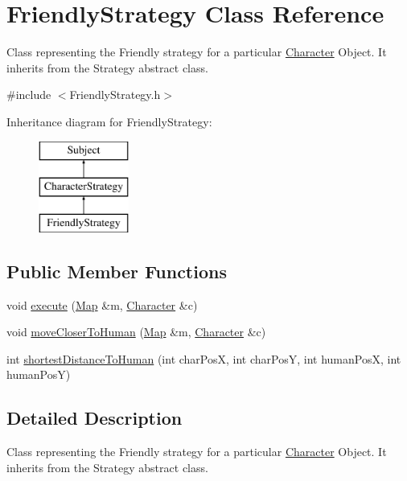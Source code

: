 \hypertarget{class_friendly_strategy}{}\section{Friendly\+Strategy Class Reference}
\label{class_friendly_strategy}


Class representing the Friendly strategy for a particular \hyperlink{class_character}{Character} Object. It inherits from the Strategy abstract class.  




{\ttfamily \#include $<$Friendly\+Strategy.\+h$>$}

Inheritance diagram for Friendly\+Strategy\+:\begin{figure}[H]
\begin{center}
\leavevmode
\includegraphics[height=3.000000cm]{class_friendly_strategy}
\end{center}
\end{figure}
\subsection*{Public Member Functions}
\begin{DoxyCompactItemize}
\item 
void \hyperlink{class_friendly_strategy_a0d09aaf92d63050e081d0509683d073d}{execute} (\hyperlink{class_map}{Map} \&m, \hyperlink{class_character}{Character} \&c)
\item 
void \hyperlink{class_friendly_strategy_a0fe250c462da3ba3bfb3b4f7ea73a4d9}{move\+Closer\+To\+Human} (\hyperlink{class_map}{Map} \&m, \hyperlink{class_character}{Character} \&c)
\item 
int \hyperlink{class_friendly_strategy_abcb7eb9d41c284fecbda4ef3398b84c0}{shortest\+Distance\+To\+Human} (int char\+PosX, int char\+PosY, int human\+PosX, int human\+PosY)
\end{DoxyCompactItemize}


\subsection{Detailed Description}
Class representing the Friendly strategy for a particular \hyperlink{class_character}{Character} Object. It inherits from the Strategy abstract class. 

